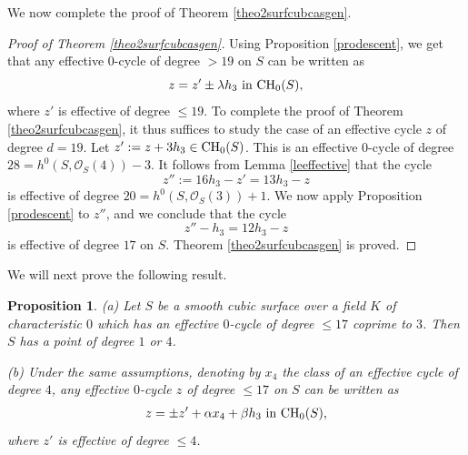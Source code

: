 \documentclass[10pt]{article}
\newtheorem{prop}[theo]{Proposition}
\begin{document}
We now complete the proof of Theorem \ref{theo2surfcubcasgen}.
\begin{proof}[Proof of Theorem  \ref{theo2surfcubcasgen}]
Using Proposition \ref{prodescent}, we get that any effective $0$-cycle of degree $>19$ on $S$ can be written
as $$z=z'\pm \lambda h_3\,\,{\rm in}\,\,{\rm CH}_0(S),$$
where $z'$ is effective of degree $\leq 19$. To complete the proof of Theorem \ref{theo2surfcubcasgen}, it thus suffices to  study the case  of an effective cycle $z$ of degree $d= 19$.
  Let $z':=z+3h_3\in {\rm CH}_0(S)$. This is an effective $0$-cycle of degree $28=h^0(S,\mathcal{O}_S(4))-3$.  It follows from Lemma \ref{leeffective} that the cycle $$z'':= 16h_3-z'=13 h_3-z$$ is effective of degree $20=h^0(S,\mathcal{O}_S(3))+1$.
We now apply  Proposition \ref{prodescent}  to $z''$, and we conclude  that the cycle
$$z''-h_3=12h_3-z$$ is effective of degree $17$ on $S$. Theorem \ref{theo2surfcubcasgen} is proved.
\end{proof}



We will  next  prove   the following result.
\begin{prop} \label{theonouvellecoray} (a)  Let $S$ be a smooth cubic surface over  a field $K$ of characteristic $0$ which has an effective $0$-cycle of degree  $\leq 17$ coprime to $3$. Then $S$ has a point of degree $1$ or $4$.

(b)  Under the same assumptions, denoting by $x_4$ the class of an effective cycle of degree $4$, any effective $0$-cycle $z$ of degree $\leq 17$ on $S$ can be written as
\begin{eqnarray}\label{eqpour0cyclecascoray} z=\pm z'+\alpha x_4+\beta h_3\,\,{\rm in}\,\,{\rm CH}_0(S),
\end{eqnarray}
where $z'$ is effective of degree $\leq 4$.
\end{prop}
\end{document}

